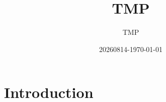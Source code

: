 \documentclass{book}
\title{TMP}
\author{TMP}
\date{20260814-\today}
\begin{document}
\maketitle          %
\tableofcontents    %

\chapter{Introduction}


% 

% 

% 
\end{document}
